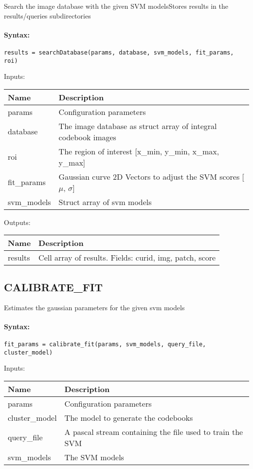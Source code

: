 Search the image database with the given SVM modelsStores results in the results/queries subdirectories

\paragraph{Syntax:} \verb|results = searchDatabase(params, database, svm_models, fit_params, roi)|

\bigskip
Inputs:

\begin{tabular}{|p{}|p{}|}
\hline
\textbf{Name} & \textbf{Description} \\
\hline \hline
params & Configuration parameters  \\ \hline
database & The image database as struct array of integral codebook images  \\ \hline
roi & The region of interest [x\_{min}, y\_{min}, x\_{max}, y\_{max}]  \\ \hline
fit\_params & Gaussian curve 2D Vectors to adjust the SVM scores [$\mu$, $\sigma$]  \\ \hline
svm\_models & Struct array of svm models  \\ \hline
\end{tabular}

\bigskip
Outputs:

\begin{tabular}{|p{}|p{}|}
\hline
\textbf{Name} & \textbf{Description} \\
\hline \hline
results & Cell array of results. Fields: curid, img, patch, score  \\ \hline
\end{tabular}

\subsection{CALIBRATE\_FIT}

Estimates the gaussian parameters for the given svm models

\paragraph{Syntax:} \verb|fit_params = calibrate_fit(params, svm_models, query_file, cluster_model)|

\bigskip
Inputs:

\begin{tabular}{|p{}|p{}|}
\hline
\textbf{Name} & \textbf{Description} \\
\hline \hline
params & Configuration parameters  \\ \hline
cluster\_model & The model to generate the codebooks  \\ \hline
query\_file & A pascal stream containing the file used to train the SVM  \\ \hline
svm\_models & The SVM models  \\ \hline
\end{tabular}


